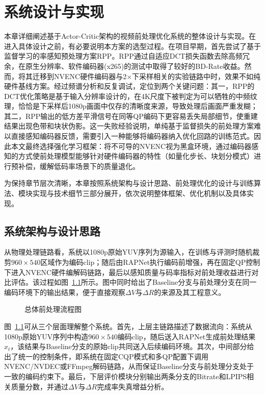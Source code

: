 \chapter{系统设计与实现}

本章详细阐述基于Actor-Critic架构的视频前处理优化系统的整体设计与实现。在进入具体设计之前，有必要说明本方案的选型过程。在项目早期，首先尝试了基于监督学习的率感知预处理方案RPP\cite{ref17-ma2023rateperception}。RPP通过自适应DCT损失函数去除高频冗余，在原生分辨率、软件编码器(x265)的测试中取得了较好的BD-Rate收益。然而，将其迁移到NVENC硬件编码器与2$\times$下采样相关的实验链路中时，效果不如纯硬件基线方案。经过频谱分析和反复调试，定位到两个关键问题：其一，RPP的DCT优化策略是基于输入分辨率设计的，在4K尺度下被判定为可以牺牲的中频纹理，恰恰是下采样后1080p画面中仅存的清晰度来源，导致处理后画面严重发糊；其二，RPP输出的低方差平滑信号在同等QP编码下更容易丢失局部细节，使重建结果出现色带和块状伪影。这一失败经验说明，单纯基于监督损失的前处理方案难以直接感知编码器反馈，需要引入一种能够将编码器纳入优化回路的训练范式。因此本文最终选择强化学习框架：将不可导的NVENC视为黑盒环境，通过编码器感知的方式使前处理模型能够针对硬件编码器的特性（如量化步长、块划分模式）\cite{ref6-li2021deep}进行预补偿，缓解低码率场景下的质量退化。

为保持章节层次清晰，本章按照系统架构与设计思路、前处理优化的设计与训练算法、模块实现与技术细节三部分展开，依次说明整体框架、优化机制以及具体实现。

\section{系统架构与设计思路}

从物理处理链路看，系统以1080p原始YUV序列为源输入，在训练与评测时随机裁剪$960\times540$区域作为编码clip；随后由RAPNet执行编码前增强，再在固定QP控制下进入NVENC硬件编解码链路，最后以感知质量与码率指标对前处理收益进行对比评估。该过程如图~\ref{fig:macro-preprocess-flow}所示。图中同时给出了Baseline分支与前处理分支在同一编码环境下的输出结果，便于直接观察$\Delta V$与$\Delta R$的来源及其工程意义。

\begin{figure}[!htbp]
  \centering
  \resizebox{0.92\textwidth}{!}{}
  \caption{总体前处理流程图}
  \label{fig:macro-preprocess-flow}
\end{figure}

图~\ref{fig:macro-preprocess-flow}可从三个层面理解整个系统。首先，上层主链路描述了数据流向：系统从1080p原始YUV序列中构造$960\times540$编码clip，随后送入RAPNet生成前处理结果$\hat{x}_t$，该结果与Baseline分支的原始clip共同送入后续编码环境。其次，中间部分给出了统一的控制条件，即系统在固定CQP模式和多QP配置下调用NVENC/NVDEC或FFmpeg解码链路，从而保证Baseline分支与前处理分支处于一致的编码约束下。最后，下层评价模块分别输出两条分支的Bitrate和LPIPS相关质量分数，并通过$\Delta V$与$\Delta R$完成率失真增益分析。

